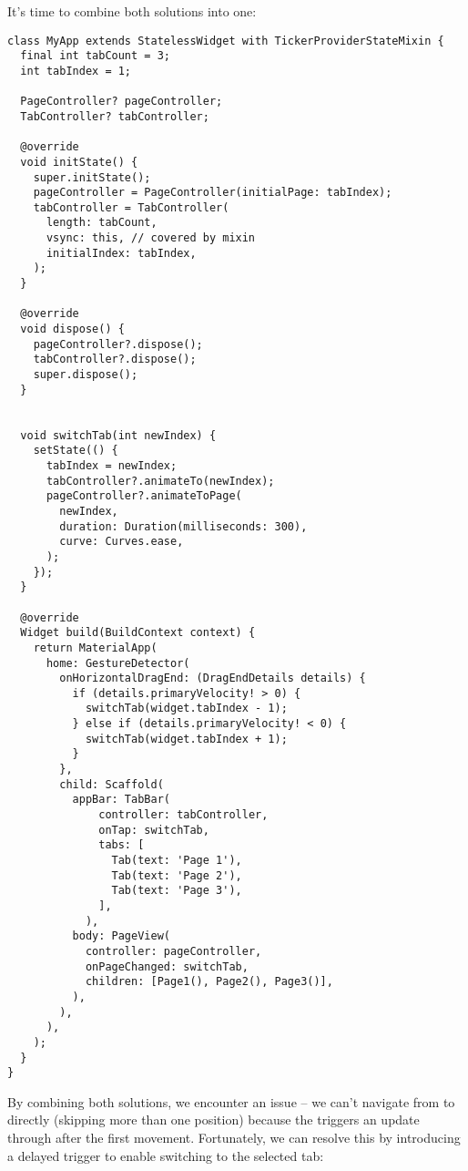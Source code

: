 \noindent It's time to combine both solutions into one:

\begin{lstlisting}
class MyApp extends StatelessWidget with TickerProviderStateMixin {
  final int tabCount = 3;
  int tabIndex = 1;

  PageController? pageController;
  TabController? tabController;

  @override
  void initState() {
    super.initState();
    pageController = PageController(initialPage: tabIndex);
    tabController = TabController(
      length: tabCount,
      vsync: this, // covered by mixin
      initialIndex: tabIndex,
    );
  }

  @override
  void dispose() {
    pageController?.dispose();
    tabController?.dispose();
    super.dispose();
  }


  void switchTab(int newIndex) {
    setState(() {
      tabIndex = newIndex;
      tabController?.animateTo(newIndex);
      pageController?.animateToPage(
        newIndex,
        duration: Duration(milliseconds: 300),
        curve: Curves.ease,
      );
    });
  }

  @override
  Widget build(BuildContext context) {
    return MaterialApp(
      home: GestureDetector(
        onHorizontalDragEnd: (DragEndDetails details) {
          if (details.primaryVelocity! > 0) {
            switchTab(widget.tabIndex - 1);
          } else if (details.primaryVelocity! < 0) {
            switchTab(widget.tabIndex + 1);
          }
        },
        child: Scaffold(
          appBar: TabBar(
              controller: tabController,
              onTap: switchTab,
              tabs: [
                Tab(text: 'Page 1'),
                Tab(text: 'Page 2'),
                Tab(text: 'Page 3'),
              ],
            ),
          body: PageView(
            controller: pageController,
            onPageChanged: switchTab,
            children: [Page1(), Page2(), Page3()],
          ),
        ),
      ),
    );
  }
}
\end{lstlisting}

\noindent By combining both solutions, we encounter an issue -- we can't navigate from  to  directly 
(skipping more than one position) because the  triggers an update through  after the 
first movement. Fortunately, we can resolve this by introducing a delayed trigger to enable switching to the selected 
tab:


